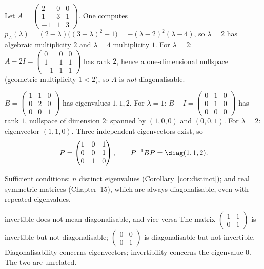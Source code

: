 \begin{example}
Let $A=\begin{pmatrix}2&0&0\\1&3&1\\-1&1&3\end{pmatrix}$. One computes $p_A(\lambda)=(2-\lambda)\big((3-\lambda)^2-1\big)=-(\lambda-2)^2(\lambda-4)$, so $\lambda=2$ has algebraic multiplicity $2$ and $\lambda=4$ multiplicity $1$. For $\lambda=2$: $A-2I=\begin{pmatrix}0&0&0\\1&1&1\\-1&1&1\end{pmatrix}$ has rank $2$, hence a one-dimensional nullspace (geometric multiplicity $1<2$), so $A$ is \emph{not} diagonalisable.
\end{example}

\begin{example}\label{ex:diag3}
$B=\begin{pmatrix}1&1&0\\0&2&0\\0&0&1\end{pmatrix}$ has eigenvalues $1,1,2$. For $\lambda=1$: $B-I=\begin{pmatrix}0&1&0\\0&1&0\\0&0&0\end{pmatrix}$ has rank $1$, nullspace of dimension $2$: spanned by $(1,0,0)$ and $(0,0,1)$. For $\lambda=2$: eigenvector $(1,1,0)$. Three independent eigenvectors exist, so
\[ P=\begin{pmatrix}1&0&1\\0&0&1\\0&1&0\end{pmatrix},\qquad P^{-1}BP=\diag(1,1,2). \]
\end{example}

Sufficient conditions: $n$ distinct eigenvalues (Corollary~\ref{cor:distinct}); and real symmetric matrices (Chapter~15), which are always diagonalisable, even with repeated eigenvalues.

\begin{pitfall}{invertible does not mean diagonalisable, and vice versa}
The matrix $\begin{pmatrix}1&1\\0&1\end{pmatrix}$ is invertible but not diagonalisable; $\begin{pmatrix}0&0\\0&1\end{pmatrix}$ is diagonalisable but not invertible. Diagonalisability concerns eigenvectors; invertibility concerns the eigenvalue $0$. The two are unrelated.
\end{pitfall}

